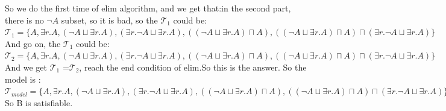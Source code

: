 \documentclass{article}
\begin{document}
    So we do the first time of elim algorithm, and we get that:in the second part, there is no $\neg A$ subset, so it is bad, so the $\mathcal{T}_1$ could be:\\
    $\mathcal{T}_1 = \{A,\exists r.A,(\neg A \sqcup \exists r.A), (\exists r. \neg A \sqcup \exists r.A), ((\neg A \sqcup \exists r.A) \sqcap A),((\neg A\sqcup \exists r.A) \sqcap A )\sqcap (\exists r.\neg A \sqcup \exists r. A) \}$\\
    And go on, the $\mathcal{T}_1$ could be:\\
    $\mathcal{T}_2 = \{A,\exists r.A,(\neg A \sqcup \exists r.A), (\exists r. \neg A \sqcup \exists r.A), ((\neg A \sqcup \exists r.A) \sqcap A),((\neg A\sqcup \exists r.A) \sqcap A )\sqcap (\exists r.\neg A \sqcup \exists r. A) \}$\\
    And we get $\mathcal{T}_1$ =$\mathcal{T}_2$, reach the end condition of elim.So this is the answer.
    So the model is :
    $\mathcal{T}_{model} = \{A,\exists r.A,(\neg A \sqcup \exists r.A), (\exists r. \neg A \sqcup \exists r.A), ((\neg A \sqcup \exists r.A) \sqcap A),((\neg A\sqcup \exists r.A) \sqcap A )\sqcap (\exists r.\neg A \sqcup \exists r. A) \}$\\
    So B is satisfiable.\\
\end{document}
